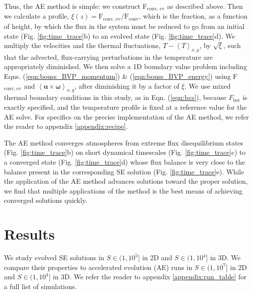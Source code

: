 \documentclass[aps, pre, onecolumn, nofootinbib, notitlepage, groupedaddress, amsfonts, amssymb, amsmath, longbibliography]{revtex4-1}
\newcommand{\angles}[1]{\ensuremath{\left\langle #1 \right\rangle}}
\begin{document}
Thus, the AE method is simple: we construct F$_{\text{conv, ev}}$ as described above.
Then we calculate a profile, 
$\xi(z) = \text{F}_{\text{conv, ev}}/\text{F}_{\text{conv}}$, which is the fraction,
as a function of height, by which the flux in the system must be reduced to go from
an initial state (Fig. \ref{fig:time_trace}b) to an evolved state (Fig. \ref{fig:time_trace}d).
We multiply the velocities
and the thermal fluctuations, $T - \angles{T}_{x,y}$, by $\sqrt{\xi}$, such 
that the advected, flux-carrying perturbations in the temperature are appropriately
diminished.  We then solve a 1D boundary value problem including
Eqns. (\ref{eqn:bouss_BVP_momentum}) \& (\ref{eqn:bouss_BVP_energy}) using F$_{\text{conv, ev}}$
and $\angles{\bm{u}\times\bm{\omega}}_{x,y}$, after diminishing it by a factor
of $\xi$. We use mixed thermal boundary conditions in this study, 
as in Eqn. (\ref{eqn:bcs}),
because $F_{\text{bot}}$ is exactly specified, and the temperature profile is fixed 
at a reference value for the AE solve.
For specifics on the precise implementation of the AE method, we refer
the reader to appendix \ref{appendix:recipe}.

The AE method converges atmospheres from extreme flux disequilibrium states 
(Fig. \ref{fig:time_trace}b) on short dynamical timescales (Fig. \ref{fig:time_trace}c)
to a converged state (Fig. \ref{fig:time_trace}d) whose flux balance is very
close to the balance present in the corresponding SE solution (Fig. \ref{fig:time_trace}e).
While the application of the AE method advances solutions toward the proper solution,
we find that multiple applications of the method is the best means of achieving converged
solutions quickly.


\vspace{-0.5cm}
\section{Results}
\label{sec:results}
We study evolved SE solutions in $S \in (1, 10^5]$ in 2D and $S \in (1, 10^4]$ in
3D. We compare their properties to
accelerated evolution (AE) runs in $S \in (1, 10^7]$ in 2D and
$S \in (1, 10^4]$ in 3D.
We refer the reader to appendix \ref{appendix:run_table} for a full list of
simulations.
\end{document}
